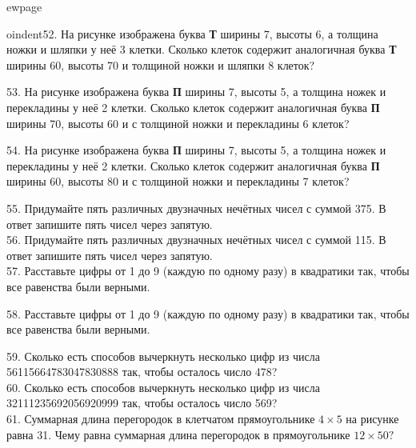 ewpage

oindent52. На рисунке изображена буква {\bf Т} ширины 7, высоты 6, а толщина ножки и шляпки у неё 3 клетки. Сколько клеток содержит аналогичная буква {\bf Т} ширины 60, высоты 70 и толщиной ножки и шляпки 8 клеток?
\begin{center}
\begin{figure}[ht!]
\end{figure}
\end{center}
53. На рисунке изображена буква {\bf П} ширины 7, высоты 5, а толщина ножек и перекладины у неё 2 клетки. Сколько клеток содержит аналогичная буква {\bf П} ширины 70, высоты 60 и с толщиной ножки и перекладины 6 клеток?
\begin{center}
\begin{figure}[ht!]
\end{figure}
\end{center}
54. На рисунке изображена буква {\bf П} ширины 7, высоты 5, а толщина ножек и перекладины у неё 2 клетки. Сколько клеток содержит аналогичная буква {\bf П} ширины 60, высоты 80 и с толщиной ножки и перекладины 7 клеток?
\begin{center}
\begin{figure}[ht!]
\end{figure}
\end{center}
55. Придумайте пять различных двузначных нечётных чисел с суммой 375. В ответ запишите пять чисел через запятую.\\
56. Придумайте пять различных двузначных нечётных чисел с суммой 115. В ответ запишите пять чисел через запятую.\\
57. Расставьте цифры от 1 до 9 (каждую по одному разу) в квадратики так, чтобы все равенства были верными.
\begin{center}
\begin{figure}[ht!]
\end{figure}
\end{center}
58. Расставьте цифры от 1 до 9 (каждую по одному разу) в квадратики так, чтобы все равенства были верными.
\begin{center}
\begin{figure}[ht!]
\end{figure}
\end{center}
59. Сколько есть способов вычеркнуть несколько цифр из числа 56115664783047830888 так, чтобы осталось число 478?\\
60. Сколько есть способов вычеркнуть несколько цифр из числа 32111235692056920999 так, чтобы осталось число 569?\\
61. Суммарная длина перегородок в клетчатом прямоугольнике $4\times5$ на рисунке равна 31. Чему равна суммарная длина перегородок в прямоугольнике $12\times50?$
\begin{center}
\begin{figure}[ht!]
\end{figure}
\end{center}


